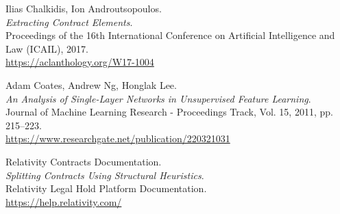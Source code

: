 \documentclass[11pt, oneside]{article}   	%
\begin{document}
\begin{thebibliography}{9}
	Ilias Chalkidis, Ion Androutsopoulos.\\
	\textit{Extracting Contract Elements}.\\
	Proceedings of the 16th International Conference on Artificial Intelligence and Law (ICAIL), 2017.\\
	\href{https://aclanthology.org/W17-1004}{https://aclanthology.org/W17-1004}
	
	Adam Coates, Andrew Ng, Honglak Lee.\\
	\textit{An Analysis of Single-Layer Networks in Unsupervised Feature Learning}.\\
	Journal of Machine Learning Research - Proceedings Track, Vol. 15, 2011, pp. 215–223.\\
	\href{https://www.researchgate.net/publication/220321031}{https://www.researchgate.net/publication/220321031}
	
	Relativity Contracts Documentation.\\
	\textit{Splitting Contracts Using Structural Heuristics}.\\
	Relativity Legal Hold Platform Documentation.\\
	\href{https://help.relativity.com/}{https://help.relativity.com/}
	
	\end{thebibliography}
	
\end{document}
